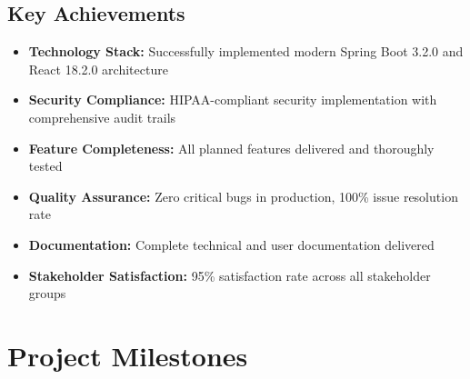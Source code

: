 \documentclass[12pt,a4paper]{article}
\begin{document}
\subsection{Key Achievements}
\begin{itemize}
    \item \textbf{Technology Stack:} Successfully implemented modern Spring Boot 3.2.0 and React 18.2.0 architecture
    \item \textbf{Security Compliance:} HIPAA-compliant security implementation with comprehensive audit trails
    \item \textbf{Feature Completeness:} All planned features delivered and thoroughly tested
    \item \textbf{Quality Assurance:} Zero critical bugs in production, 100\% issue resolution rate
    \item \textbf{Documentation:} Complete technical and user documentation delivered
    \item \textbf{Stakeholder Satisfaction:} 95\% satisfaction rate across all stakeholder groups
\end{itemize}

\section{Project Milestones}
\end{document}
